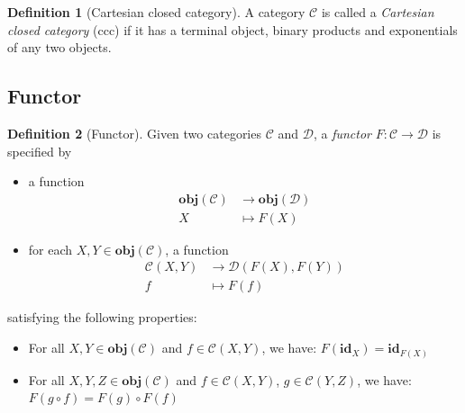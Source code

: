 \documentclass[12pt,twoside,a4paper]{report}
\theoremstyle{definition}
\newtheorem{definition}{Definition}
\theoremstyle{definition}
\theoremstyle{definition}
\theoremstyle{definition}
\begin{document}
        \begin{definition}[Cartesian closed category]
            A category $\mathcal{C}$ is called a \emph{Cartesian closed category} (ccc) if it has a terminal object, binary products and exponentials of any two objects.
        \end{definition}

        
        \subsection{Functor}
        \begin{definition}[Functor]
            Given two categories $\mathcal{C}$ and $\mathcal{D}$, a \emph{functor} $F: \mathcal{C} \to \mathcal{D}$ is specified by
            \begin{itemize}
                \item 
                    a function 
                    \[\begin{aligned}
                        \textbf{obj}(\mathcal{C}) &\to \textbf{obj}(\mathcal{D}) \\
                        X &\mapsto F(X)
                    \end{aligned}\]

                \item 
                    for each $X, Y \in \textbf{obj}(\mathcal{C})$, a function 
                    \[\begin{aligned}
                        \mathcal{C}{(X,Y)} &\to \mathcal{D}{(F(X),F(Y))} \\
                        f &\mapsto F(f)
                    \end{aligned}\]
            \end{itemize}
            satisfying the following properties:
            \begin{itemize}
                \item 
                    For all $X, Y \in \textbf{obj}(\mathcal{C})$ and $f \in \mathcal{C}{(X,Y)}$, we have: $ F(\textbf{id}_X) = \textbf{id}_{F(X)}$
                \item
                    For all $X, Y, Z \in \textbf{obj}(\mathcal{C})$ and $f \in \mathcal{C}{(X,Y)}$, $g \in \mathcal{C}{(Y,Z)}$, we have: $F(g \circ f) = F(g) \circ F(f)$
            \end{itemize}
        \end{definition}

        
\end{document}
